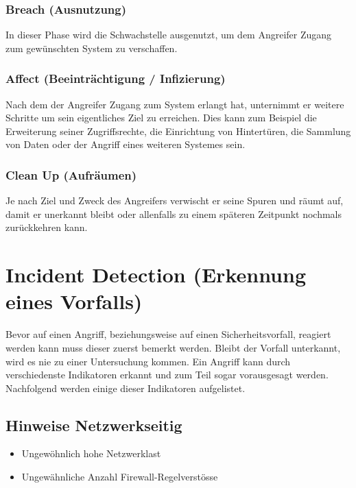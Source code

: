 \subsubsection{Breach (Ausnutzung)}
In dieser Phase wird die Schwachstelle ausgenutzt, um dem Angreifer Zugang zum gewünschten System zu verschaffen.

\subsubsection{Affect (Beeinträchtigung / Infizierung)}
Nach dem der Angreifer Zugang zum System erlangt hat, unternimmt er weitere Schritte um sein eigentliches Ziel zu erreichen. Dies kann zum Beispiel die Erweiterung seiner Zugriffsrechte, die Einrichtung von Hintertüren, die Sammlung von Daten oder der Angriff eines weiteren Systemes sein.


\subsubsection{Clean Up (Aufräumen)}
Je nach Ziel und Zweck des Angreifers verwischt er seine Spuren und räumt auf, damit er unerkannt bleibt oder allenfalls zu einem späteren Zeitpunkt nochmals zurückkehren kann.

\section{Incident Detection (Erkennung eines Vorfalls)}
Bevor auf einen Angriff, beziehungsweise auf einen Sicherheitsvorfall, reagiert werden kann muss dieser zuerst bemerkt werden. Bleibt der Vorfall unterkannt, wird es nie zu einer Untersuchung kommen.
Ein Angriff kann durch verschiedenste Indikatoren erkannt und zum Teil sogar vorausgesagt werden. Nachfolgend werden einige dieser Indikatoren aufgelistet.

\subsection{Hinweise Netzwerkseitig}
\begin{itemize}
  \item Ungewöhnlich hohe Netzwerklast
  \item Ungewähnliche Anzahl Firewall-Regelverstösse
\end{itemize}

